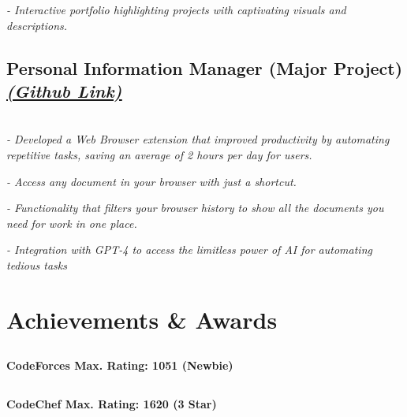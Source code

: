 \documentclass[a4paper,11pt]{article}
\begin{document}
	{\hspace{-1.5em}}\textsl{- Interactive portfolio highlighting projects with captivating visuals and descriptions.}
	
    \subsection{Personal Information Manager{\textbf{ (Major Project)}}{\hspace{15em}}\underline{\textsl{\href{https://github.com/akshaynaresh/Personal-Information-Manager}{(Github Link)}}}}
	
	\textsl{\\- Developed a Web Browser extension that improved productivity by automating repetitive tasks, saving an average of 2 hours per day for users.}
	
	\hspace{-1.5em}\textsl{- Access any document in your browser with just a shortcut.}

	\hspace{-1.5em}\textsl{- Functionality that filters your browser history to show all the documents you need for work in one place.}

	\hspace{-1.5em}\textsl{- Integration with GPT-4 to access the limitless power of AI for automating tedious tasks}




	\vspace{-1.1em}
	


	\section{Achievements \& Awards}
	
	\subsection{}\hspace{0.5em}\textbf{CodeForces Max. Rating: 1051 (Newbie)}
	\subsection{}\hspace{0.5em}\textbf{CodeChef Max. Rating: 1620 (3 Star) }
\end{document}
